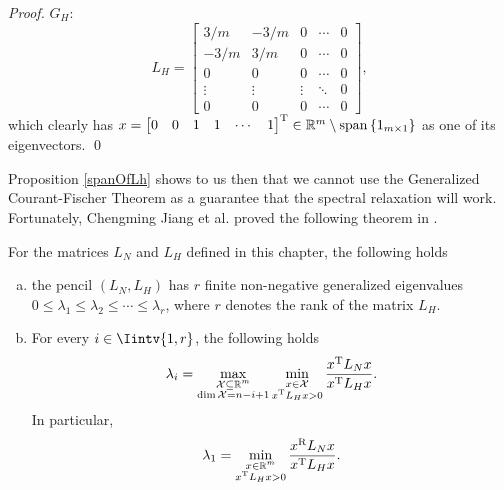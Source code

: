 \begin{proof}
   $G_H$:
   \begin{equation*}
      L_H =
      \begin{bmatrix}
         3/m & -3/m & 0 & \cdots & 0 \\
         -3/m & 3/m & 0 & \cdots & 0 \\
         0 & 0 & 0 & \cdots & 0 \\
         \vdots & \vdots & \vdots & \ddots & 0 \\
         0 & 0 & 0 & \cdots & 0 
      \end{bmatrix},
   \end{equation*}
   which clearly has $x = {\begin{bmatrix} 0 & 0 & 1 & 1 & \cdots & 1 \end{bmatrix}}^{\rm T} \in \mathbb R ^{m} \setminus \operatorname{span\,} \{ 1_{m \times 1} \}$ as one of its eigenvectors. \qed
\end{proof}

Proposition \vref{spanOfLh} shows to us then that we cannot use the Generalized Courant-Fischer Theorem as a guarantee that the spectral relaxation will work.
Fortunately, Chengming Jiang et al. proved the following theorem in \cite{fastge2}.

\begin{theorem}
   \label{fastge2theorem}
   For the matrices $L_N$ and $L_H$ defined in this chapter, the following holds
   \begin{enumerate}[(a)]
      \item the pencil $(L_N, L_H)$ has $r$ finite non-negative generalized eigenvalues $0 \le \lambda_1 \le \lambda_2 \le \cdots \le \lambda_r$, where $r$ denotes the rank of the matrix $L_H$.
      \item For every $i \in \Iintv{1,r}$, the following holds
         \begin{equation}
            \lambda_i = \max_{\substack{\mathcal X \subseteq \mathbb R^m \\ \dim {\mathcal X} = n-i+1 }} \min_{\substack{x \in \mathcal X \\ x^{\rm T} L_H x > 0}} \frac{x^{\rm T} L_N x}{x^{\rm T} L_H x}.
         \end{equation}
         In particular, 
         \begin{equation}
            \lambda_1 = \min_{\substack{x \in \mathbb R^m \\ x^{\rm T}L_Hx>0}} \frac{x^{\rm R}L_N x}{x^{\rm T} L_H x}.
         \end{equation}
   \end{enumerate}
\end{theorem}


